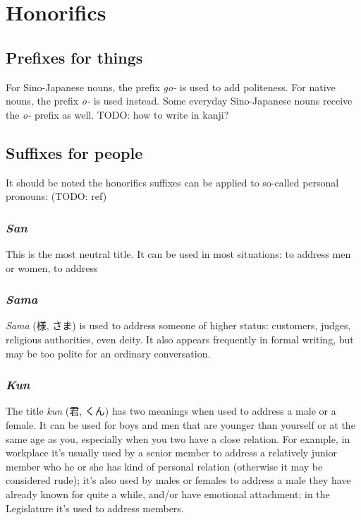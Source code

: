 \documentclass[UTF8, a4paper, oneside, scheme=plain]{ctexrep}
\newcommand{\corpus}[1]{\emph{#1}}
\begin{document}
\section{Honorifics}\label{sec:nominal-polite}

\subsection{Prefixes for things}\label{sec:object-honorifics-prefix}

For Sino-Japanese nouns, the prefix \corpus{go-} is used to add politeness.
For native nouns, the prefix \corpus{o-} is used instead.
Some everyday Sino-Japanese nouns receive the \corpus{o-} prefix as well.
TODO: how to write in kanji?

\subsection{Suffixes for people}

It should be noted the honorifics suffixes can be applied to so-called personal pronouns: (TODO: ref)

\subsubsection{\corpus{San}}

This is the most neutral title.
It can be used in most situations:
to address men or women, to address 

\subsubsection{\corpus{Sama}}

\corpus{Sama} (様, さま) is used to address someone of higher status:
customers, judges, religious authorities, even deity.
It also appears frequently in formal writing, 
but may be too polite for an ordinary conversation.

\subsubsection{\corpus{Kun}}

The title \corpus{kun} (君, くん) has two meanings when used to address a male or a female.
It can be used for boys and men that are younger than yourself or at the same age as you,
especially when you two have a close relation.
For example, 
in workplace it's usually used by a senior member to address a relatively junior member 
who he or she has kind of personal relation (otherwise it may be considered rude);
it's also used by males or females to address a male they have already known for quite a while,
and/or have emotional attachment;
in the Legislature it's used to address members.
\end{document}
